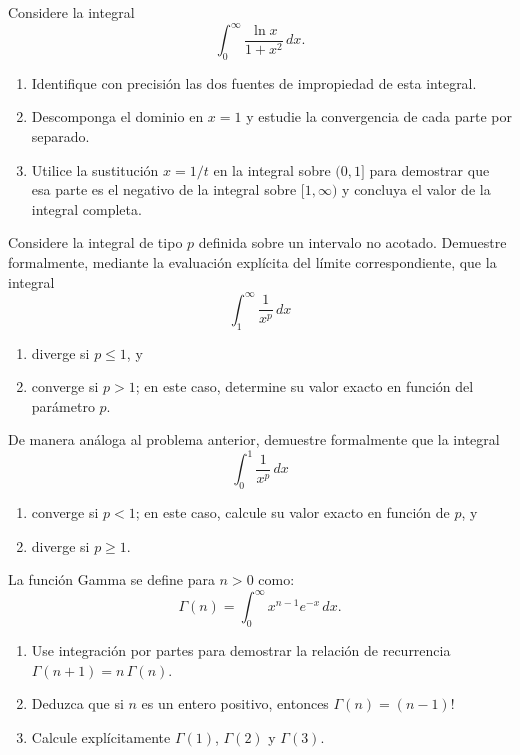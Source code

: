 
\begin{prob}
Considere la integral
\[
    \int_{0}^{\infty} \frac{\ln x}{1 + x^2} \, dx.
\]
\begin{enumerate}
    \item Identifique con precisión las dos fuentes de impropie\-dad de esta
          integral.
    \item Descomponga el dominio en $x = 1$ y estudie la convergencia de
          cada parte por separado.
    \item Utilice la sustitución $x = 1/t$ en la integral sobre $(0,1]$
          para demostrar que esa parte es el negativo de la integral sobre
          $[1, \infty)$ y concluya el valor de la integral completa.
\end{enumerate}
\end{prob}

\begin{prob}
Considere la integral de tipo $p$ definida sobre un intervalo no acotado.
Demuestre formalmente, mediante la evaluación explícita del límite
correspondiente, que la integral
\[
    \int_{1}^{\infty} \frac{1}{x^p} \, dx
\]
\begin{enumerate}
    \item diverge si $p \leq 1$, y
    \item converge si $p > 1$; en este caso, determine su valor exacto
          en función del parámetro $p$.
\end{enumerate}
\end{prob}

\begin{prob}
De manera análoga al problema anterior, demuestre formalmente que la
integral
\[
    \int_{0}^{1} \frac{1}{x^p} \, dx
\]
\begin{enumerate}
    \item converge si $p < 1$; en este caso, calcule su valor exacto en
          función de $p$, y
    \item diverge si $p \geq 1$.
\end{enumerate}
\end{prob}

\begin{prob}
La función Gamma se define para $n > 0$ como:
\[
    \Gamma(n) = \int_{0}^{\infty} x^{n-1} e^{-x} \, dx.
\]
\begin{enumerate}
    \item Use integración por partes para demostrar la relación de
          recurrencia $\Gamma(n+1) = n\,\Gamma(n)$.
    \item Deduzca que si $n$ es un entero positivo, entonces
          $\Gamma(n) = (n-1)!$
    \item Calcule explícitamente $\Gamma(1)$, $\Gamma(2)$ y $\Gamma(3)$.
\end{enumerate}
\end{prob}

